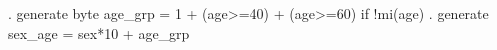 . generate byte age_grp = 1 + (age>=40) + (age>=60) if !mi(age)
{\smallskip}
. generate sex_age = sex*10 + age_grp
{\smallskip}
